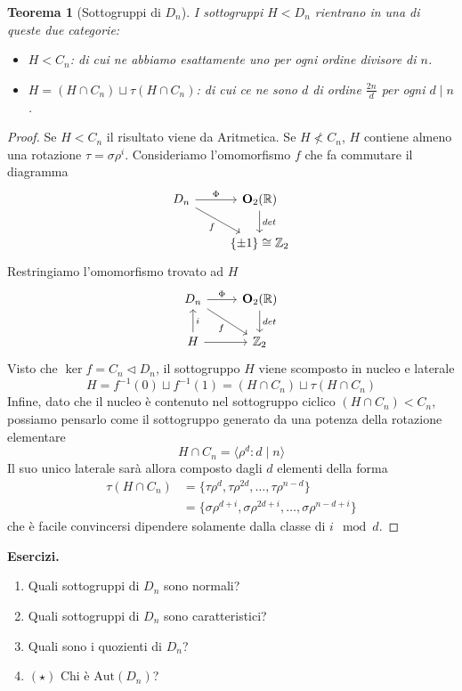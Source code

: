 \documentclass[a4paper]{article}
\newtheorem{theorem}{Teorema}[section]
\theoremstyle{remark}
\theoremstyle{definition}
\newcommand{\Aut}[1]{\mathrm{Aut}\left( #1 \right)}
\begin{document}
\begin{multicols}{2}
\begin{theorem}[Sottogruppi di $ D_n $]
	I sottogruppi $ H < D_n $ rientrano in una di queste due categorie:
	\begin{itemize}
		\item $ H < C_n $: di cui ne abbiamo esattamente uno per ogni ordine divisore di $ n $.
		\item $ H = (H \cap C_n) \sqcup \tau(H\cap C_n) $: di cui ce ne sono $ d $ di ordine $ \frac{2n}{d} $ per ogni $ d \mid n $.
	\end{itemize}
\end{theorem}
\begin{proof}
	Se $ H < C_n $ il risultato viene da Aritmetica. Se $ H \nless C_n $, $ H $ contiene almeno una rotazione $ \tau = \sigma\rho^i $. Consideriamo l'omomorfismo $ f $ che fa commutare il diagramma
	\[ \begin{tikzcd}
	D_n \arrow{r}{\Phi} \arrow[swap]{dr}{f} & \mathbf{O}_2(\mathbb{R}) \arrow{d}{det} \\
	& \{\pm 1\} \cong \mathbb{Z}_2	\end{tikzcd}
	\]
	Restringiamo l'omomorfismo trovato ad $ H $
	\[ \begin{tikzcd}
	D_n \arrow{r}{\Phi} \arrow[swap]{dr}{f} & \mathbf{O}_2(\mathbb{R}) \arrow{d}{det} \\
	H \arrow{r}{} \arrow[swap]{u}{i} & \mathbb{Z}_2	\end{tikzcd}
	\]
	Visto che $ \ker f = C_n \lhd D_n $, il sottogruppo $ H $ viene scomposto in nucleo e laterale
	\[ H = f^{-1}(0) \sqcup f^{-1}(1) = (H \cap C_n) \sqcup \tau (H\cap C_n) \]
	Infine, dato che il nucleo è contenuto nel sottogruppo ciclico $ (H \cap C_n) < C_n $, possiamo pensarlo come il sottogruppo generato da una potenza della rotazione elementare \[ H \cap C_n = \langle \rho^d \colon d \mid n \rangle \] Il suo unico laterale sarà allora composto dagli $ d $ elementi della forma  \begin{align*}\tau(H\cap C_n) &=  \{\tau\rho^d, \tau\rho^{2d}, \dots, \tau\rho^{n-d} \} \\ &= \{\sigma\rho^{d+i}, \sigma\rho^{2d+i}, \dots, \sigma\rho^{n-d +i} \}\end{align*}  che è facile convincersi dipendere solamente dalla classe di $ i \mod d $.
\end{proof}

\textbf{Esercizi.}
\begin{enumerate}
	\item Quali sottogruppi di $ D_n $ sono normali?
	\item Quali sottogruppi di $ D_n $ sono caratteristici?
	\item Quali sono i quozienti di $ D_n $?
	\item $ (\star) $ Chi è $ \Aut{D_n} $?
\end{enumerate}

\end{multicols}
\end{document}

